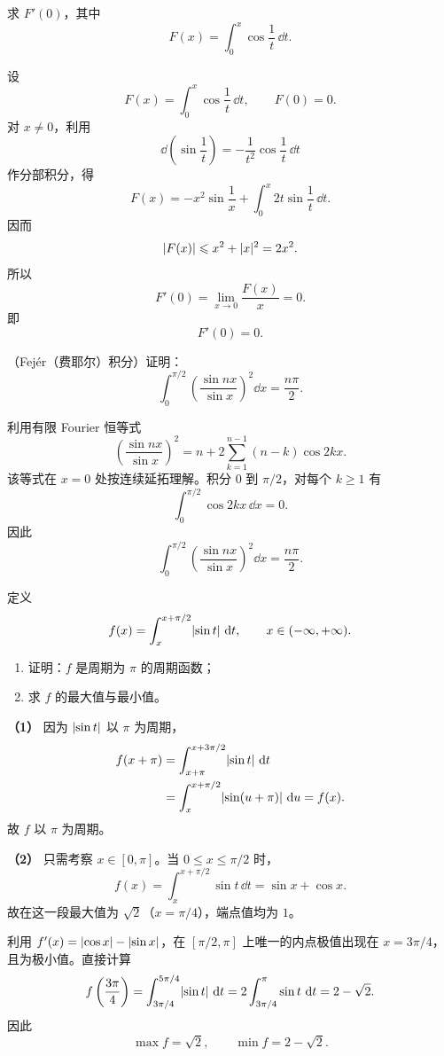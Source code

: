 \begin{xexercise}[9]
求 $F'(0)$，其中
\[
  F(x)=\int_0^x\cos\frac1t\,\dd t.
\]
\end{xexercise}
\begin{xsolution}
设
\[
  F(x)=\int_0^x\cos\frac1t\,\dd t,
  \qquad F(0)=0.
\]
对 $x\ne0$，利用
\[
  \dd\left(\sin\frac1t\right)=-\frac1{t^2}\cos\frac1t\,\dd t
\]
作分部积分，得
\[
  F(x)=-x^2\sin\frac1x+\int_0^x2t\sin\frac1t\,\dd t.
\]
因而
\[
  \lvert F(x)\rvert\leqslant x^2+\lvert x\rvert^2=2x^2.
\]
所以
\[
  F'(0)=\lim_{x\to0}\frac{F(x)}x=0.
\]
即
\[
  \boxed{F'(0)=0}.
\]
\end{xsolution}


\begin{xexercise}[10]
（Fejér（费耶尔）积分）证明：
\[
  \int_0^{\pi/2}\left(\frac{\sin nx}{\sin x}\right)^2\dd x=\frac{n\pi}{2}.
\]
\end{xexercise}
\begin{xsolution}
利用有限 Fourier 恒等式
\[
  \left(\frac{\sin nx}{\sin x}\right)^2
  =n+2\sum_{k=1}^{n-1}(n-k)\cos2kx.
\]
该等式在 $x=0$ 处按连续延拓理解。积分 $0$ 到 $\pi/2$，对每个 $k\geqslant1$ 有
\[
  \int_0^{\pi/2}\cos2kx\,\dd x=0.
\]
因此
\[
  \boxed{\int_0^{\pi/2}\left(\frac{\sin nx}{\sin x}\right)^2\dd x
  =\frac{n\pi}{2}}.
\]
\end{xsolution}


\begin{xexercise}[11]
定义
\[
  f(x)=\int_x^{x+\pi/2}\lvert\sin t\rvert\,\mathop{}\!\mathrm{d} t,
  \qquad x\in(-\infty,+\infty).
\]
\begin{enumerate}[label=(\arabic*)]
  \item 证明：$f$ 是周期为 $\pi$ 的周期函数；
  \item 求 $f$ 的最大值与最小值。
\end{enumerate}
\end{xexercise}
\begin{xsolution}
\textbf{（1）}\quad
因为 $\lvert\sin t\rvert$ 以 $\pi$ 为周期，
\begin{align*}
  f(x+\pi)
  &=\int_{x+\pi}^{x+3\pi/2}\lvert\sin t\rvert\,\mathop{}\!\mathrm{d} t\\
  &=\int_x^{x+\pi/2}\lvert\sin(u+\pi)\rvert\,\mathop{}\!\mathrm{d} u
  =f(x).
\end{align*}
故 $f$ 以 $\pi$ 为周期。

\textbf{（2）}\quad
只需考察 $x\in[0,\pi]$。当 $0\leqslant x\leqslant\pi/2$ 时，
\[
  f(x)=\int_x^{x+\pi/2}\sin t\,\dd t
  =\sin x+\cos x.
\]
故在这一段最大值为 $\sqrt2$（$x=\pi/4$），端点值均为 $1$。

利用 $f'(x)=\lvert\cos x\rvert-\lvert\sin x\rvert$，在 $[\pi/2,\pi]$ 上唯一的内点极值出现在 $x=3\pi/4$，且为极小值。直接计算
\[
  f\left(\frac{3\pi}4\right)
  =\int_{3\pi/4}^{5\pi/4}\lvert\sin t\rvert\,\mathop{}\!\mathrm{d} t
  =2\int_{3\pi/4}^{\pi}\sin t\,\mathop{}\!\mathrm{d} t
  =2-\sqrt2.
\]
因此
\[
  \boxed{\max f=\sqrt2,\qquad \min f=2-\sqrt2}.
\]
\end{xsolution}


